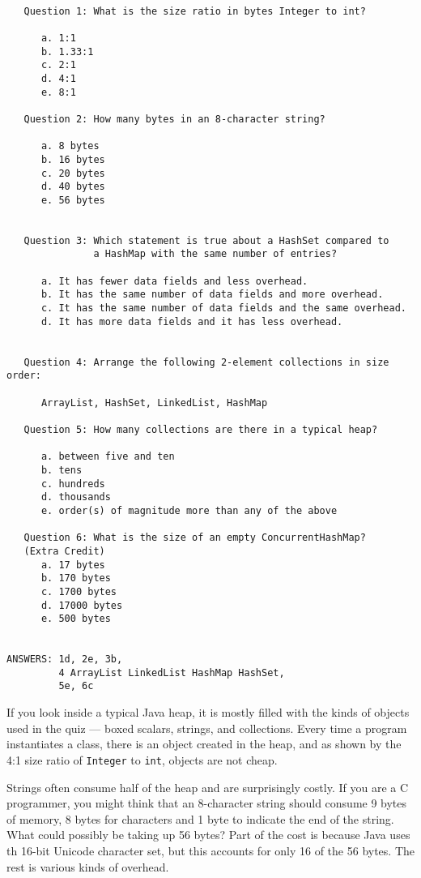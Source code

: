 \begin{verbatim}

   Question 1: What is the size ratio in bytes Integer to int?
   
      a. 1:1
      b. 1.33:1
      c. 2:1
      d. 4:1
      e. 8:1
   
   Question 2: How many bytes in an 8-character string?

      a. 8 bytes
      b. 16 bytes
      c. 20 bytes
      d. 40 bytes
      e. 56 bytes
 
   
   Question 3: Which statement is true about a HashSet compared to 
               a HashMap with the same number of entries?
               
      a. It has fewer data fields and less overhead.
      b. It has the same number of data fields and more overhead.
      c. It has the same number of data fields and the same overhead.
      d. It has more data fields and it has less overhead.
                  
                       
   Question 4: Arrange the following 2-element collections in size order:
    
      ArrayList, HashSet, LinkedList, HashMap
          
   Question 5: How many collections are there in a typical heap?
   
      a. between five and ten
      b. tens
      c. hundreds
      d. thousands
      e. order(s) of magnitude more than any of the above

   Question 6: What is the size of an empty ConcurrentHashMap?
   (Extra Credit)
      a. 17 bytes
      b. 170 bytes
      c. 1700 bytes
      d. 17000 bytes
      e. 500 bytes
           

ANSWERS: 1d, 2e, 3b, 
         4 ArrayList LinkedList HashMap HashSet, 
         5e, 6c                 
\end{verbatim}

If you look inside a typical Java heap, it is mostly filled with the kinds of objects used in the quiz --- boxed scalars, 
strings, and collections. Every time a program instantiates a class, there is an object created in the heap, and as 
shown by the 4:1 size ratio of \texttt{Integer} to \texttt{int}, objects are not cheap. 

Strings often consume half of the heap and are surprisingly costly. 
If you are a C programmer, you might think that an 8-character string should consume 9 bytes of memory, 
8 bytes for characters and 1 byte to indicate the end of the string. What could possibly be taking up 56 bytes? 
Part of the cost is because Java uses th 16-bit Unicode character set, but this accounts for only 16 of the 56 bytes. 
The rest is various kinds of overhead.

